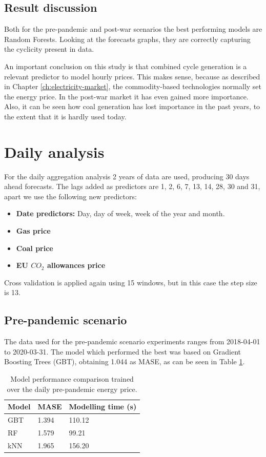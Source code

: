 \subsection{Result discussion}
Both for the pre-pandemic and post-war scenarios the best performing models are Random Forests. Looking at the forecasts graphs, they are correctly capturing the cyclicity present in data.

An important conclusion on this study is that combined cycle generation is a relevant predictor to model hourly prices. This makes sense, because as described in Chapter \ref{ch:electricity-market}, the commodity-based technologies normally set the energy price. In the post-war market it has even gained more importance. Also, it can be seen how coal generation has lost importance in the past years, to the extent that it is hardly used today.


\newpage
\section{Daily analysis}
For the daily aggregation analysis 2 years of data are used, producing 30 days ahead forecasts. The lags added as predictors are 1, 2, 6, 7, 13, 14, 28, 30 and 31, apart we use the following new predictors:

\begin{itemize}
    \item \textbf{Date predictors:} Day, day of week, week of the year and month.
    \item \textbf{Gas price}
    \item \textbf{Coal price}
    \item \textbf{EU $CO_2$ allowances price}
\end{itemize}

\noindent Cross validation is applied again using 15 windows, but in this case the step size is 13.

\subsection{Pre-pandemic scenario}
The data used for the pre-pandemic scenario experiments ranges from 2018-04-01 to 2020-03-31. The model which performed the best was based on Gradient Boosting Trees (GBT), obtaining 1.044 as MASE, as can be seen in Table \ref{tab:cv-daily-prep}.

\begin{table}[H]
\centering
\begin{tabular}{@{}l|l|l@{}}
\toprule
Model & MASE  & Modelling time (s)  \\ \midrule
GBT   & 1.394 & 110.12 \\
RF    & 1.579 & 99.21  \\
kNN   & 1.965 & 156.20 \\ \bottomrule
\end{tabular}
\caption{Model performance comparison trained over the daily pre-pandemic energy price.}
\label{tab:cv-daily-prep}
\end{table}

